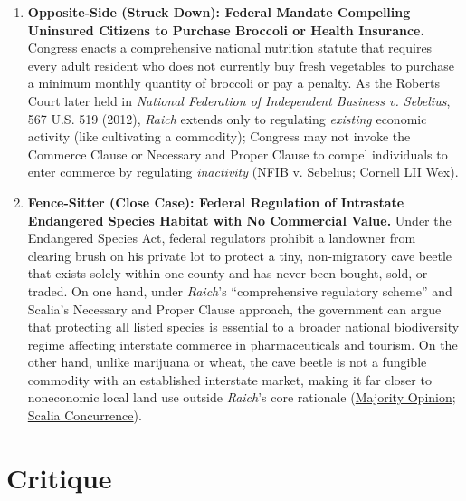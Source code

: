 \documentclass[12pt]{article}
\begin{document}
\begin{enumerate}
\item \textbf{Opposite-Side (Struck Down): Federal Mandate Compelling Uninsured Citizens to Purchase Broccoli or Health Insurance.} Congress enacts a comprehensive national nutrition statute that requires every adult resident who does not currently buy fresh vegetables to purchase a minimum monthly quantity of broccoli or pay a penalty. As the Roberts Court later held in \textit{National Federation of Independent Business v. Sebelius}, 567 U.S. 519 (2012), \textit{Raich} extends only to regulating \textit{existing} economic activity (like cultivating a commodity); Congress may not invoke the Commerce Clause or Necessary and Proper Clause to compel individuals to enter commerce by regulating \textit{inactivity} (\href{https://supreme.justia.com/cases/federal/us/567/11-393/case.pdf}{NFIB v. Sebelius}; \href{https://www.law.cornell.edu/wex/enumerated_powers}{Cornell LII Wex}).

\item \textbf{Fence-Sitter (Close Case): Federal Regulation of Intrastate Endangered Species Habitat with No Commercial Value.} Under the Endangered Species Act, federal regulators prohibit a landowner from clearing brush on his private lot to protect a tiny, non-migratory cave beetle that exists solely within one county and has never been bought, sold, or traded. On one hand, under \textit{Raich}'s ``comprehensive regulatory scheme'' and Scalia's Necessary and Proper Clause approach, the government can argue that protecting all listed species is essential to a broader national biodiversity regime affecting interstate commerce in pharmaceuticals and tourism. On the other hand, unlike marijuana or wheat, the cave beetle is not a fungible commodity with an established interstate market, making it far closer to noneconomic local land use outside \textit{Raich}'s core rationale (\href{https://www.law.cornell.edu/supct/html/03-1454.ZO.html}{Majority Opinion}; \href{https://www.law.cornell.edu/supct/html/03-1454.ZC.html}{Scalia Concurrence}).
\end{enumerate}

\section{Critique}
\end{document}
